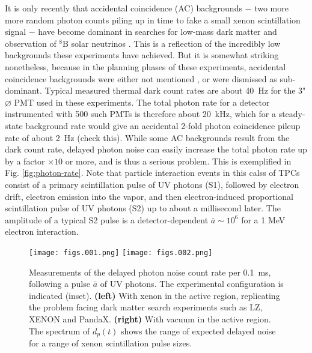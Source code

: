 \documentclass[%
 reprint,
superscriptaddress,
nofootinbib,
 amsmath,amssymb,
 aps,
prl,
]{revtex4-2}
\begin{document}
It is only recently that accidental coincidence (AC) backgrounds $-$ two more more random photon counts piling up in time to fake a small xenon scintillation signal $-$ have become dominant in searches for low-mass dark matter and observation of $^8$B solar neutrinos \cite{PandaX:2022aac,XENON:2024ijk}. This is a reflection of the incredibly low backgrounds these experiments have achieved. But it is somewhat striking nonetheless, because in the planning phases of these experiments, accidental coincidence backgrounds were either not mentioned \cite{XENON:2024wpa}, or were dismissed \cite{Mount:2017qzi} as sub-dominant. Typical measured thermal dark count rates are about 40~Hz for the 3" $\varnothing$ PMT used in these experiments. The total photon rate for a detector instrumented with 500 such PMTs is therefore about 20~kHz, which for a steady-state background rate would give an accidental 2-fold photon coincidence pileup rate of about 2~Hz (check this). While some AC backgrounds result from the dark count rate, delayed photon noise can easily increase the total photon rate up by a factor $\times 10$ or more, and is thus a serious problem. This is exemplified in Fig. \ref{fig:photon-rate}. Note that particle interaction events in this calss of TPCs consist of a primary scintillation pulse of UV photons (S1), followed by electron drift, electron emission into the vapor, and then electron-induced proportional scintillation pulse of UV photons (S2) up to about a millisecond later. The amplitude of a typical S2 pulse is a detector-dependent $\bar{a}\sim10^6$ for a 1 MeV electron interaction.

\begin{figure}[ht]
    \centering
    \texttt{[image: figs.001.png]}
    \texttt{[image: figs.002.png]}
    \caption{Measurements of the delayed photon noise count rate per 0.1~ms, following a pulse $\bar{a}$ of UV photons. The experimental configuration is indicated (inset). \textbf{(left)} With xenon in the active region, replicating the problem facing dark matter search experiments such as LZ, XENON and PandaX. \textbf{(right)} With vacuum in the active region. The spectrum of $d_p(t)$ shows the range of expected delayed noise for a range of xenon scintillation pulse sizes. }
   \label{fig:xe}
\end{figure}
\end{document}
